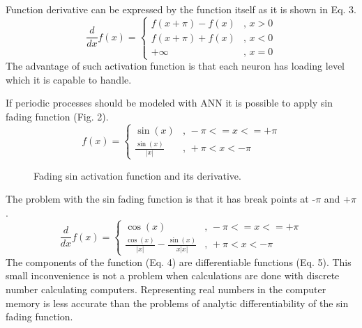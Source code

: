 \documentclass{llncs}
\begin{document}
%
Function derivative can be expressed by the function itself as it is shown in Eq. 3.
%
\begin{equation}
\frac{d}{dx}f(x) = 
\left\{
	\begin{array}{ll}
		f(x + \pi) - f(x) & \mbox{, } x > 0 \\
		f(x + \pi) + f(x) & \mbox{, } x < 0 \\
		+\infty & \mbox{, } x = 0
	\end{array}
\right.
\end{equation}
%
The advantage of such activation function is that each neuron has loading level which it is capable to handle. 

If periodic processes should be modeled with ANN it is possible to apply sin fading function (Fig. 2).
%
\begin{equation}
f(x) = 
\left\{
	\begin{array}{ll}
		\sin(x) & \mbox{, } -\pi <= x <= +\pi \\
		\frac {\sin(x)} { |x| } & \mbox{, } +\pi < x < -\pi
	\end{array}
\right.
\end{equation}
%
\begin{figure}
    \centering
    \caption{Fading sin activation function and its derivative.}
    \label{fig:fig02}
\end{figure}
%
The problem with the sin fading function is that it has break points at -$\pi$ and +$\pi$.
%
\begin{equation}
\frac{d}{dx}f(x) = 
\left\{
	\begin{array}{ll}
		\cos(x) & \mbox{, } -\pi <= x <= +\pi \\
		\frac {\cos(x)} { |x| } - \frac{ \sin(x) }{ x |x| } & \mbox{, } +\pi < x < -\pi
	\end{array}
\right.
\end{equation}
%
The components of the function (Eq. 4) are differentiable functions (Eq. 5). This small inconvenience is not a problem when calculations are done with discrete number calculating computers. Representing real numbers in the computer memory is less accurate than the problems of analytic differentiability of the sin fading function. 
%
\end{document}
